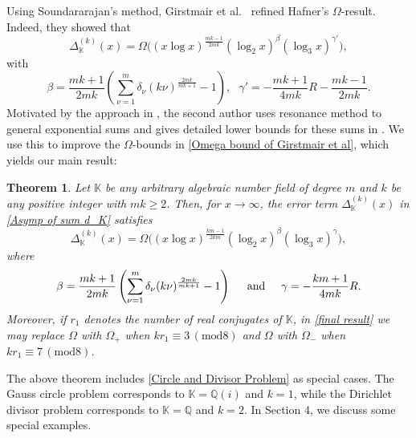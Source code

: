 \documentclass[reqno]{amsart}
\numberwithin{equation}{section}
\theoremstyle{plain}
\newtheorem{theorem}{Theorem}[section]
\begin{document}
Using Soundararajan's \cite{Sound} method, Girstmair et al.\ \cite{GKMN} refined Hafner's \cite{Halfner(2)} $\Omega$-result.
 Indeed, they showed that 
\begin{equation}\label{Omega bound of Girstmair et al}
	\Delta_{\mathbb{K}}^{(k)}(x) = \Omega\Big( (x\log x)^{\frac{mk-1}{2mk}} (\log_2x)^{\beta} (\log_3 x)^{\gamma'} \Big),
\end{equation}
	with
\begin{equation}\label{beta and gamma}
	\beta = \frac{mk+1}{2mk} \left( \sum_{\nu =1}^{m}\delta_{\nu} (k\nu )^{\frac{2mk}{mk+1}}-1\right), \ \  \ \gamma'= - \frac{mk+1}{4mk}{R} - \frac{mk-1}{2mk}.
\end{equation}
Motivated by the approach in \cite{AMM}, the second author uses resonance method to general exponential sums and gives detailed lower bounds for these sums in \cite[Theorem 5]{K. Mahatab}. We use this to improve the $\Omega$-bounds in \eqref{Omega bound of Girstmair et al}, which yields our main result:
	\begin{theorem} \label{Main Result}
	Let $\mathbb{K}$ be any arbitrary algebraic number field of degree $m$ and $k$ be any positive integer with $mk\geq 2$. Then, for $x \rightarrow \infty$, the error term $\Delta_{\mathbb{K}}^{(k)}(x)$ in \eqref{Asymp of sum d_K} satisfies 
	\begin{equation} \label{final result}
		\Delta_{\mathbb{K}}^{(k)}(x) = \Omega\Big( (x\log x)^{\frac{km-1}{2km}} (\log_2 x)^{\beta} (\log_3 x)^{\gamma} \Big),
	\end{equation} 
	where 
	\begin{equation*}
	\beta = \frac{mk+1}{2mk} \left( \sum_{\nu =1}^{m}\delta_{\nu} (k\nu )^{\frac{2mk}{mk+1}}-1\right) \hspace{0.5cm}\text{and} \hspace{0.5cm}\gamma= - \frac{km+1}{4mk}{R}.
	\end{equation*}
 Moreover, if $r_1$ denotes the number of real conjugates of  $\mathbb{K}$,
 in \eqref{final result} we may replace $\Omega$ with $\Omega_{+}$  when $kr_1 \equiv 3 \,(\mathrm{mod} 8)$ and $\Omega$ with $\Omega_{-}$ when $kr_1 \equiv 7 \,(\mathrm{mod} 8)$.
	\end{theorem}
	The above theorem includes \eqref{Circle and Divisor Problem} as special cases. The Gauss circle problem corresponds to $\mathbb{K}=\mathbb{Q}(i)$ and $k=1$, while the Dirichlet divisor problem corresponds to $\mathbb{K}=\mathbb{Q}$ and $k=2$. In Section 4, we discuss some special examples.
	
\end{document}
